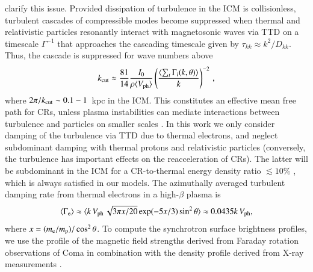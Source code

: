 \documentclass[a4paper,fleqn,usenatbib]{mnras}
\newcommand{\Vph}{V_\mathrm{ph}}
\begin{document}
clarify this issue. Provided dissipation of turbulence in the ICM is
collisionless, turbulent cascades of compressible modes become
suppressed when thermal and relativistic particles resonantly interact
with magnetosonic waves via TTD on a timescale $\Gamma^{-1}$ that
approaches the cascading timescale given by $\tau_{kk} \approx
k^2/D_{kk}$. Thus, the cascade is suppressed for wave numbers above
\begin{equation}
\label{eq:kc}
  k_\rmn{cut} \approx \frac{81}{14} \frac{I_0}{\rho \langle \Vph \rangle}
  \left(\frac{\langle\sum_i \Gamma_i(k,\theta)\rangle}{k}\right)^{-2}\,,
\end{equation}
where $2\pi/k_{\mathrm{cut}}\sim 0.1-1$~kpc in the ICM. This constitutes an
effective mean free path for CRs, unless plasma instabilities can
mediate interactions between turbulence and particles on smaller
scales \citep{brunetti11}. In this work we only consider damping of
the turbulence via TTD due to thermal electrons, and neglect
subdominant damping with thermal protons and relativistic particles
(conversely, the turbulence has important effects on the
reacceleration of CRs). The latter will be subdominant in the ICM for
a CR-to-thermal energy density ratio $\lesssim 10 \%$
\citep{brunetti07}, which is always satisfied in our models. The
azimuthally averaged turbulent damping rate from thermal electrons
\citep{brunetti07} in a high-$\beta$ plasma is
\begin{equation}
\label{eq:Gamma_e}
\langle\Gamma_{\rmn{e}}\rangle \approx \langle k\,\Vph\,\sqrt{3\pi
  x/20}\exp(-5x/3)\sin^2{\theta}\rangle\approx 0.0435k\,\Vph, 
\end{equation}
where $x=(m_{{\mathrm{e}}}/m_{{\mathrm{p}}})/\cos^2{\theta}$. To compute the
synchrotron surface brightness profiles, we use the profile of the
magnetic field strengths derived from Faraday rotation observations of
Coma \citep{bonafede10} in combination with the density profile
derived from X-ray measurements \citep{1992A&A...259L..31B}.
\end{document}
